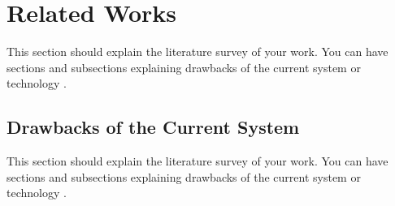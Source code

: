 
\chapter{Related Works}

This section should explain the literature survey of your work. You can have sections and subsections explaining drawbacks of the current system or technology \cite{RW2}.\\[1ex]

\section{Drawbacks of the Current System}

This section should explain the literature survey of your work. You can have sections and subsections explaining drawbacks of the current system or technology \cite{RW2}.\\[1ex]





